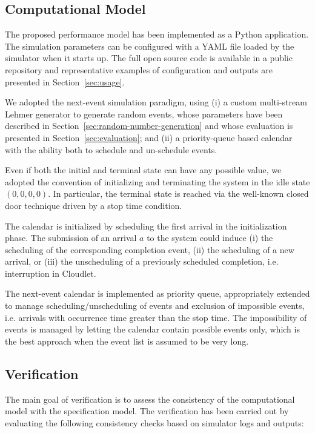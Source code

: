 \subsection{Computational Model}
The proposed performance model has been implemented as a Python application. 
The simulation parameters can be configured with a YAML file loaded by the simulator when it starts up.
The full open source code is available in a public repository \cite{gmarciani-pydes} and representative examples of configuration and outputs are presented in Section~\ref{sec:usage}.

We adopted the next-event simulation paradigm, using 
(i) a custom multi-stream Lehmer generator to generate random events, whose parameters have been described in Section~\ref{sec:random-number-generation} and whose evaluation is presented in Section~\ref{sec:evaluation}; and
(ii) a priority-queue based calendar with the ability both to schedule and un-schedule events.

Even if both the initial and terminal state can have any possible value, we adopted the convention of initializing and terminating the system in the idle state $(0,0,0,0)$. In particular, the terminal state is reached via the well-known closed door technique driven by a stop time condition.

The calendar is initialized by scheduling the first arrival in the initialization phase. The submission of an arrival $a$ to the system could induce
(i) the scheduling of the corresponding completion event,
(ii) the scheduling of a new arrival, or
(iii) the unscheduling of a previously scheduled completion, i.e. interruption in Cloudlet.

The next-event calendar is implemented as priority queue, appropriately extended to manage scheduling/unscheduling of events and exclusion of impossible events, i.e. arrivals with occurrence time greater than the stop time.
The impossibility of events is managed by letting the calendar contain possible events only, which is the best approach when the event list is assumed to be very long.


\subsection{Verification}
The main goal of verification is to assess the consistency of the computational model with the specification model.
The verification has been carried out by evaluating the following consistency checks based on simulator logs and outputs:

